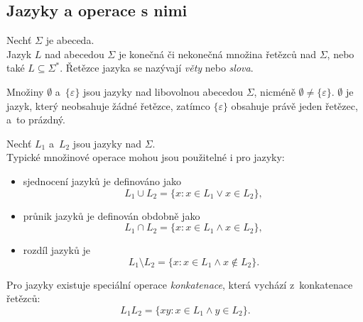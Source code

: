 \subsection*{Jazyky a operace s nimi}
\begin{definition}
    Nechť $\Sigma$ je abeceda. \\
    Jazyk $L$ nad abecedou $\Sigma$ je konečná či nekonečná množina řetězců nad $\Sigma$, nebo také $L \subseteq \Sigma^*$.
    Řetězce jazyka se nazývají \emph{věty} nebo \emph{slova}.

    Množiny $\emptyset$ a~$\{\varepsilon\}$ jsou jazyky nad libovolnou abecedou $\Sigma$, nicméně $\emptyset \neq \{\varepsilon\}$. $\emptyset$ je jazyk, který neobsahuje žádné řetězce, zatímco $\{\varepsilon\}$ obsahuje právě jeden řetězec, a~to prázdný.
\end{definition}

\begin{definition}
    Nechť $L_1$ a~$L_2$ jsou jazyky nad $\Sigma$.\\
    Typické množinové operace mohou jsou použitelné i pro jazyky:
    \begin{itemize}
        \item sjednocení jazyků je definováno jako 
        \begin{equation*}
            L_1 \cup L_2 = \{x : x \in L_1 \vee x \in L_2\},
        \end{equation*}
        \item průnik jazyků je definován obdobně jako
        \begin{equation*}
            L_1 \cap L_2 = \{x : x \in L_1 \wedge x \in L_2\},
        \end{equation*}
        \item rozdíl jazyků je
        \begin{equation*}
            L_1 \setminus L_2 = \{x : x \in L_1 \wedge x \notin L_2\}.
        \end{equation*} 
    \end{itemize}
    Pro jazyky existuje speciální operace \emph{konkatenace}, která vychází z~konkatenace řetězců:
    \begin{equation*}
        L_1L_2 = \{xy : x \in L_1 \wedge y \in L_2\}.   
    \end{equation*} 
\end{definition}

